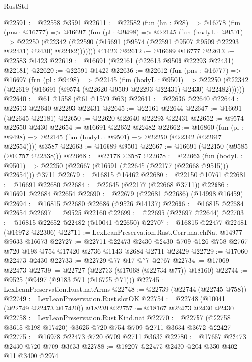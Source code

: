 \begin{lexlean}{RustStd}
\begin{coremodule}
@22591 := @22558 @3591
@22611 := @22582
    (fun (hn : @28) =>
    @16778
      (fun (pns : @16777) =>
      @16697
        (fun (pl : @9498) =>
        @22145
          (fun (bodyL : @9501) =>
          @22250
            (@22342 (@22590 (@16691 (@9574 (@22591 @9507 @9509 @22293 @22431) @2430) @22482)))))))
    @1423
@22612 := @16689 @16777
@22613 := @22583 @1423
@22619 := @16691 (@22161 (@22613 @9509 @22293 @22431) @22181)
@22620 := @22591 @1423
@22636 := @22612
    (fun (pns : @16777) =>
    @16697
      (fun (pl : @9498) =>
      @22145
        (fun (bodyL : @9501) =>
        @22250 (@22342 (@22619 (@16691 (@9574 (@22620 @9509 @22293 @22431) @2430) @22482))))))
@22640 := @61 @1558 (@61 @1579 @63)
@22641 := @22636 @22640
@22644 := @22613 @22640 @22293 @22431
@22645 := @22161 @22644
@22647 := @16691 (@22645 @22181)
@22650 := @22620 @22640 @22293 @22431
@22652 := @9574 @22650 @2430
@22654 := @16691 @22652 @22482
@22662 := @16860
    (fun (pl : @9498) => @22145 (fun (bodyL : @9501) => @22250 (@22342 (@22647 @22654))))
    @3587
@22663 := @16689 @9501
@22667 := @16691 (@22150 (@9585 (@10757 @22338)))
@22668 := @22178 @3587
@22678 := @22663
    (fun (bodyL : @9501) => @22250 (@22667 (@16691 (@22645 (@22177 (@22668 @9515))) @22654)))
    @3711
@22679 := @16815 @16462
@22680 := @22150 @10761
@22681 := @16691 @22680
@22684 := @22645 (@22177 (@22668 @3711))
@22686 := @16691 @22684 @22654
@22690 := @22679 (@22681 @22686) (@14998 @16459)
@22694 := @16815 @22680 @22686 (@9526 @14137)
@22696 := @16815 @22684 @22654
@22697 := @9525 @22160
@22699 := @22696 (@22697 @22644)
@22703 := @16815 @22652 @22482 (@10041 @22650)
@22707 := @16815 @22477 @22481 (@16972 @22306)
@22711 := LexLeanPreservation.Rust.Corr.matchNat @14977 @9633 @16673
@22727 := @22711
    @22473
    @2430
    @2430
    @709
    @126
    @758
    @2767
    @720
    @198
    @754
    @17420
    @2736
    @1143
    @2684
    @2711
    @22429
@22729 := @17060 @22473 @2430
@22733 := @22729 @77 @17 @77 @2767
@22734 := @17069 @22473
@22739 := @22727 (@22733 (@17068 (@22734 @77)) @18160)
@22744 := @9525 (@9497 (@9183 @71 (@16725 @71)))
@22745 := LexLeanPreservation.Rust.natArms
@22748 := @22739 (@22744 (@22745 @758))
@22749 := LexLeanPreservation.Rust.slotOK
@22754 := @22748 (@10041 (@22749 @22473 @17420)) @18239
@22757 := @18167 @22473 @2430 @2430
@22758 := LexLeanPreservation.Rust.Kind.nat
@22770 := @22757 (@22758 @3615 @198 @17420) @3625 @720 @754 @709 @2711 @3634 @3672 @22427
@22775 := @16978 @22473 @720 @709 @2711 @3633
@22780 := @17657 @22473 @2430 @720 @709 @3633
@22788 := @19207 @22473 @2430 @204 @350 @402 @11 @3400 @2974

\end{coremodule}
\end{lexlean}
